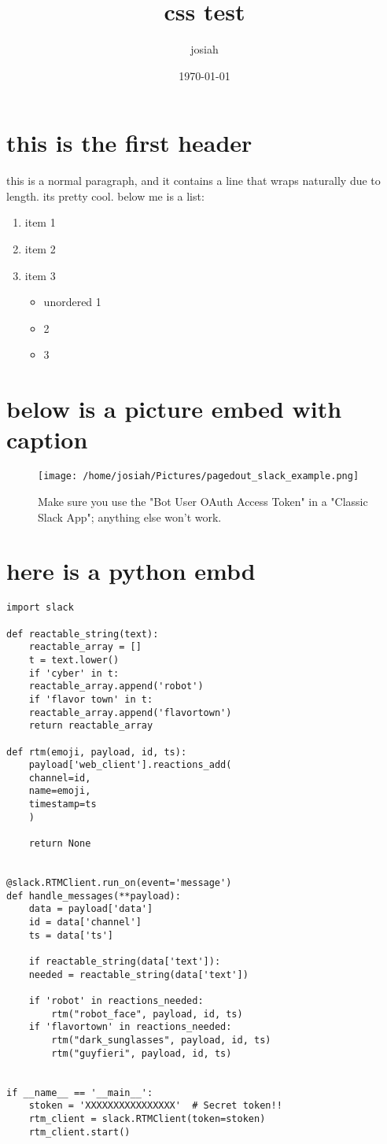 \documentclass[11pt]{article}
\author{josiah}
\date{\today}
\title{css test}
\begin{document}
\maketitle
\section*{this is the first header}
\label{sec:org4b9debc}
this is a normal paragraph, and it contains a line that wraps naturally due to length. its pretty cool. below me is a list:
\begin{enumerate}[noitemsep]
\item item 1
\item item 2
\item item 3
\begin{itemize}
\item unordered 1
\item 2
\item 3
\end{itemize}
\end{enumerate}

\section*{below is a picture embed with caption}
\label{sec:org5388653}
\begin{figure}[htbp]
\centering
\texttt{[image: /home/josiah/Pictures/pagedout\_slack\_example.png]}
\caption{\label{fig:orgb453e3c}Make sure you use the "Bot User OAuth Access Token" in a "Classic Slack App"; anything else won't work.}
\end{figure}

\section*{here is a python embd}
\label{sec:orgd1e1678}

\begin{verbatim}
import slack

def reactable_string(text):
    reactable_array = []
    t = text.lower()
    if 'cyber' in t:
	reactable_array.append('robot')
    if 'flavor town' in t:
	reactable_array.append('flavortown')
    return reactable_array

def rtm(emoji, payload, id, ts):
    payload['web_client'].reactions_add(
	channel=id,
	name=emoji,
	timestamp=ts
    )

    return None


@slack.RTMClient.run_on(event='message')
def handle_messages(**payload):
    data = payload['data']
    id = data['channel']
    ts = data['ts']

    if reactable_string(data['text']):
	needed = reactable_string(data['text'])

	if 'robot' in reactions_needed:
	    rtm("robot_face", payload, id, ts)
	if 'flavortown' in reactions_needed:
	    rtm("dark_sunglasses", payload, id, ts)
	    rtm("guyfieri", payload, id, ts)


if __name__ == '__main__':
    stoken = 'XXXXXXXXXXXXXXXX'  # Secret token!!
    rtm_client = slack.RTMClient(token=stoken)
    rtm_client.start()
\end{verbatim}
\end{document}
